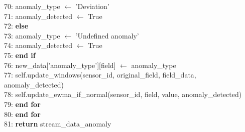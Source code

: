 \begin{breakablealgorithm}[H]
\begin{flushleft}
70: \hspace{1.5em} anomaly\_type $\gets$ 'Deviation' \\
71: \hspace{1.5em} anomaly\_detected $\gets$ True \\
72: \hspace{1em} \textbf{else} \\
73: \hspace{1.5em} anomaly\_type $\gets$ 'Undefined anomaly' \\
74: \hspace{1.5em} anomaly\_detected $\gets$ True \\
75: \hspace{1em} \textbf{end if} \\
76: \hspace{1em} new\_data['anomaly\_type'][field] $\gets$ anomaly\_type \\
77: \hspace{1em} self.update\_windows(sensor\_id, original\_field, field\_data, anomaly\_detected) \\
78: \hspace{1em} self.update\_ewma\_if\_normal(sensor\_id, field, value, anomaly\_detected) \\
79: \hspace{0.5em} \textbf{end for} \\
80: \textbf{end for} \\
81: \textbf{return} stream\_data\_anomaly
\end{flushleft}
\end{breakablealgorithm}